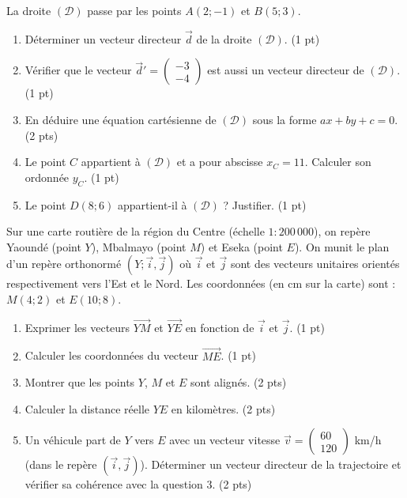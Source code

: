 \documentclass[11pt]{article}
\begin{document}
\begin{exercice}
La droite $(\mathcal{D})$ passe par les points $A(2; -1)$ et $B(5; 3)$.
\begin{enumerate}
    \item Déterminer un vecteur directeur $\vec{d}$ de la droite $(\mathcal{D})$. \hfill (1 pt)
    \item Vérifier que le vecteur $\vec{d}'=\begin{pmatrix} -3 \\ -4 \end{pmatrix}$ est aussi un vecteur directeur de $(\mathcal{D})$. \hfill (1 pt)
    \item En déduire une équation cartésienne de $(\mathcal{D})$ sous la forme $ax+by+c=0$. \hfill (2 pts)
    \item Le point $C$ appartient à $(\mathcal{D})$ et a pour abscisse $x_C=11$. Calculer son ordonnée $y_C$. \hfill (1 pt)
    \item Le point $D(8; 6)$ appartient-il à $(\mathcal{D})$ ? Justifier. \hfill (1 pt)
\end{enumerate}
\end{exercice}

\begin{exercice}
Sur une carte routière de la région du Centre (échelle $1:200\,000$), on repère Yaoundé (point $Y$), Mbalmayo (point $M$) et Eseka (point $E$). On munit le plan d'un repère orthonormé $(Y; \vec{i}, \vec{j})$ où $\vec{i}$ et $\vec{j}$ sont des vecteurs unitaires orientés respectivement vers l'Est et le Nord. Les coordonnées (en cm sur la carte) sont : $M(4; 2)$ et $E(10; 8)$.
\begin{enumerate}
    \item Exprimer les vecteurs $\overrightarrow{YM}$ et $\overrightarrow{YE}$ en fonction de $\vec{i}$ et $\vec{j}$. \hfill (1 pt)
    \item Calculer les coordonnées du vecteur $\overrightarrow{ME}$. \hfill (1 pt)
    \item Montrer que les points $Y$, $M$ et $E$ sont alignés. \hfill (2 pts)
    \item Calculer la distance réelle $YE$ en kilomètres. \hfill (2 pts)
    \item Un véhicule part de $Y$ vers $E$ avec un vecteur vitesse $\vec{v}=\begin{pmatrix} 60 \\ 120 \end{pmatrix}$ km/h (dans le repère $(\vec{i}, \vec{j})$). Déterminer un vecteur directeur de la trajectoire et vérifier sa cohérence avec la question 3. \hfill (2 pts)
\end{enumerate}
\end{exercice}
\end{document}
